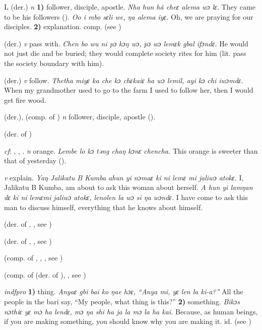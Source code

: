 \begin{letter}{L}
 (der.) \textit{n} \textbf{1)} follower, disciple, apostle. \textit{Nha hun hã cheɛ alema wɔ lɛ.} They came to be his followers (\citealt{Pichl1967}). \textit{Oo i mbo sɛli we, ŋa alema iyɛ.} Oh, we are praying for our disciples. \textbf{2)} explanation. comp.  (see )

 (der.) \textit{v} pass with. \textit{Chen bo wu ni pɔ kɔŋ wɔ, pɔ wɔ lemɛk gbal ifɔndɛ.} He would not just die and be buried; they would complete society rites for him (lit. pass the society boundary with him).

 (der.) \textit{v} follow. \textit{Thetha miyɛ ka che kɔ chɛkaiɛ ha wɔ lemil, ayi kɔ chi iwɔmdɛ.} When my grandmother used to go to the farm I used to follow her, then I would get fire wood.

 (der.), (comp. of ) \textit{n} follower, disciple, apostle (\citealt{Pichl1967}).

 (der. of )

 \textit{cf}: , , . \textit{n} orange. \textit{Lembe lo kɔ təng chaŋ kɔnɛ chencha.} This orange is sweeter than that of yesterday (\citealt{Pichl1967}). 

 \textit{v} explain. \textit{Yaŋ Jalikatu B Kumba ahun yi nɔmaɛ ki ni lemɛ mi jaliwɔ atokɛ.} I, Jalikatu B Kumba, am about to ask this woman about herself. \textit{A hun yi lamŋan dɛ ki ni lemɛmi jaliwɔ atokɛ, lenolen la wɔ si ŋa wɔndɛ.} I have come to ask this man to discuss himself, everything that he knows about himself.

 (der. of , , see ) 

 (der. of , , see ) 

 (comp. of , , , see ) 

 (comp. of  (der. of ), , see ) 

 \textit{indfpro} \textbf{1)} thing. \textit{Anyaɛ gbi bai ko ŋae hɔɛ, “Anya mi, yɛ len la ki-a?”} All the people in the bari say, “My people, what thing is this?” \textbf{2)} something. \textit{Bikɔs nɔthiɛ yɛ mɔ ha lendɛ, mɔ ŋa shi ha ja la mɔ la ha kai.} Because, as human beings, if you are making something, you should know why you are making it. id.  (see ) 


\end{letter}
